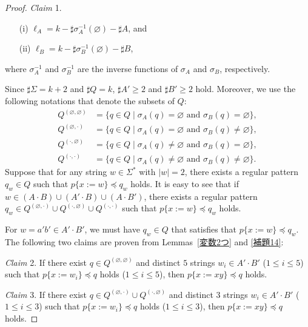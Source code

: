 \begin{proof}
\noindent
\textit{Claim} 1. 
\begin{enumerate}
  \item[(i)] $\ell_{A} = k - \sharp \sigma_{A}^{-1}(\varnothing) - \sharp A$, and
  \item[(ii)] $\ell_{B} = k - \sharp \sigma_{B}^{-1}(\varnothing) - \sharp B$,
\end{enumerate}
where $\sigma_{A}^{-1}$ and $\sigma_{B}^{-1}$ are the inverse functions of $\sigma_{A}$ and $\sigma_{B}$, respectively.

\smallskip

Since $\sharp \Sigma = k + 2$ and $\sharp Q = k$, $\sharp A' \geq 2$ and $\sharp B' \geq 2$ hold.
Moreover, we use the following notations that denote the subsets of $Q$:
\begin{align*}
  Q^{(\varnothing,\varnothing)} & = \{q \in Q \mid \sigma_{A}(q) = \varnothing \textrm{~and~} \sigma_{B}(q) = \varnothing\},\\
  Q^{(\varnothing,\cdot)} & = \{q \in Q \mid \sigma_{A}(q) = \varnothing \textrm{~and~} \sigma_{B}(q) \not= \varnothing\},\\
  Q^{(\cdot,\varnothing)} & = \{q \in Q \mid \sigma_{A}(q) \not= \varnothing \textrm{~and~} \sigma_{B}(q) = \varnothing\},\\
  Q^{(\cdot,\cdot)} & = \{q \in Q \mid \sigma_{A}(q) \not= \varnothing \textrm{~and~} \sigma_{B}(q) \not= \varnothing\}.
\end{align*}
Suppose that for any string $w \in \Sigma^{\ast}$ with $|w|=2$, there exists a regular pattern $q_{w} \in Q$ such that $p \{ x:=w \} \preceq q_{w}$ holds.
It is easy to see that if $w \in (A\cdot B) \cup (A'\cdot B) \cup (A\cdot B')$, there exists a regular pattern $q_{w} \in Q^{(\varnothing,\cdot)} \cup Q^{(\cdot,\varnothing)} \cup Q^{(\cdot,\cdot)}$ such that $p \{ x:=w \} \preceq q_{w}$ holds.

For $w=a'b'\in A'\cdot B'$, we must have $q_{w} \in Q$ that satisfies that $p \{ x:=w \} \preceq q_{w}$. The following two claims are proven from Lemmas~\ref{変数2つ} and \ref{補題14}:

\smallskip

\noindent
\textit{Claim} 2. If there exist $q \in Q^{(\varnothing,\varnothing)}$ and distinct $5$ strings $w_{i} \in A'\cdot B'$ ($1\leq i\leq 5$) such  that $p \{ x:=w_{i} \} \preceq q$ holds ($1\leq i\leq 5$),  then $p \{ x:=xy \} \preceq q$ holds.

\smallskip

\noindent
\textit{Claim} 3. If there exist $q \in Q^{(\varnothing,\cdot)} \cup Q^{(\cdot,\varnothing)}$ and distinct $3$ strings $w_{i} \in A'\cdot B'$ ($1\leq i\leq 3$) such that $p \{ x:=w_{i} \} \preceq q$ holds ($1\leq i\leq 3$),  then $p \{ x:=xy \} \preceq q$ holds.


\end{proof}
